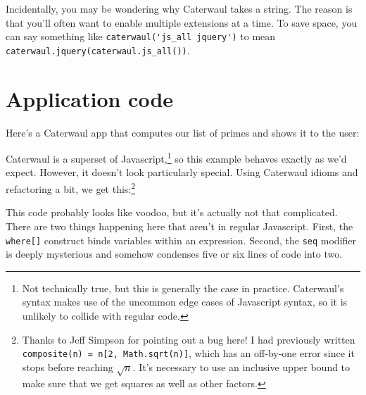 \documentclass{report}
\begin{document}
    Incidentally, you may be wondering why Caterwaul takes a string. The reason is that you'll often want to enable multiple extensions at a time. To save space, you can say something like
    \verb|caterwaul('js_all jquery')| to mean \verb|caterwaul.jquery(caterwaul.js_all())|.

\section{Application code}
    Here's a Caterwaul app that computes our list of primes and shows it to the user:


    Caterwaul is a superset of Javascript,\footnote{Not technically true, but this is generally the case in practice. Caterwaul's syntax makes use of the uncommon edge cases of Javascript
    syntax, so it is unlikely to collide with regular code.} so this example behaves exactly as we'd expect. However, it doesn't look particularly special. Using Caterwaul idioms and
    refactoring a bit, we get this:\footnote{Thanks to Jeff Simpson for pointing out a bug here! I had previously written {\tt composite(n) = n[2, Math.sqrt(n)]}, which has an off-by-one error
    since it stops before reaching $\sqrt n$. It's necessary to use an inclusive upper bound to make sure that we get squares as well as other factors.}


    This code probably looks like voodoo, but it's actually not that complicated. There are two things happening here that aren't in regular Javascript. First, the {\tt where[]} construct
    binds variables within an expression. Second, the {\tt seq} modifier is deeply mysterious and somehow condenses five or six lines of code into two.
\end{document}
